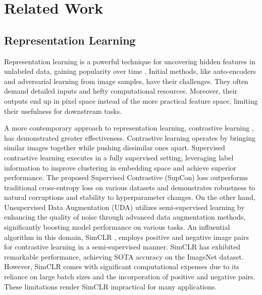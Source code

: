 \section{Related Work}

\subsection{Representation Learning}

Representation learning is a powerful technique for uncovering hidden features in unlabeled data, gaining popularity over time \cite{scholkopf2021toward,hamilton2017representation,le2020contrastive}. Initial methods, like auto-encoders \cite{zhang2019aet, goyal2017nonparametric} and adversarial learning \cite{sarafianos2019adversarial,radford2015unsupervised,donahue2019large} from image samples, have their challenges. They often demand detailed inputs and hefty computational resources. Moreover, their outputs end up in pixel space instead of the more practical feature space, limiting their usefulness for downstream tasks.

A more contemporary approach to representation learning, contrastive learning \cite{tian2020makes,chuang2020debiased}, has demonstrated greater effectiveness. Contrastive learning operates by bringing similar images together while pushing dissimilar ones apart. Supervised contrastive learning \cite{khosla2020supervised} executes in a fully supervised setting, leveraging label information to improve clustering in embedding space and achieve superior performance. The proposed Supervised Contrastive (SupCon) loss outperforms traditional cross-entropy loss on various datasets and demonstrates robustness to natural corruptions and stability to hyperparameter changes. On the other hand, Unsupervised Data Augmentation (UDA) \cite{xie2020unsupervised}  utilizes semi-supervised learning by enhancing the quality of noise through advanced data augmentation methods, significantly boosting model performance on various tasks. An influential algorithm in this domain, SimCLR \cite{chen2020simple}, employs positive and negative image pairs for contrastive learning in a semi-supervised manner. SimCLR has exhibited remarkable performance, achieving SOTA accuracy on the ImageNet \cite{deng2009imagenet} dataset. However, SimCLR comes with significant computational expenses due to its reliance on large batch sizes and the incorporation of positive and negative pairs. These limitations render SimCLR impractical for many applications.

